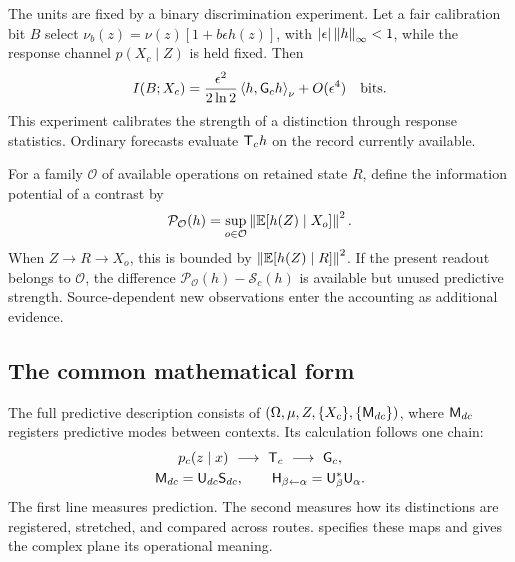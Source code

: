 The units are fixed by a binary discrimination experiment. Let a fair calibration bit \(B\) select \(\nu_b(z)=\nu(z)[1+b\epsilon h(z)]\), with \(|\epsilon|\left\lVert h\right\rVert_\infty<1\), while the response channel \(p(X_c\mid Z)\) is held fixed. Then
\begin{equation}
I(B;X_c)=\frac{\epsilon^2}{2\ln2}\left\langle h,\mathsf G_ch\right\rangle_\nu+O(\epsilon^4)
\quad\text{bits}.
\label{eq:calibration}
\end{equation}
This experiment calibrates the strength of a distinction through response statistics. Ordinary forecasts evaluate \(\mathsf T_ch\) on the record currently available.

For a family \(\mathcal O\) of available operations on retained state \(R\), define the information potential of a contrast by
\begin{equation*}
\mathcal P_{\mathcal O}(h)=\sup_{o\in\mathcal O}
\left\lVert\mathbb E[h(Z)\mid X_o]\right\rVert^2.
\end{equation*}
When \(Z\to R\to X_o\), this is bounded by \(\left\lVert\mathbb E[h(Z)\mid R]\right\rVert^2\). If the present readout belongs to \(\mathcal O\), the difference \(\mathcal P_{\mathcal O}(h)-\mathcal S_c(h)\) is available but unused predictive strength. Source-dependent new observations enter the accounting as additional evidence.

\subsection{The common mathematical form}
The full predictive description consists of \((\Omega,\mu,Z,\{X_c\},\{\mathsf M_{dc}\})\), where \(\mathsf M_{dc}\) registers predictive modes between contexts. Its calculation follows one chain:
\begin{equation}
\begin{gathered}
p_c(z\mid x)\ \longrightarrow\ \mathsf T_c\ \longrightarrow\ \mathsf G_c,\\
\mathsf M_{dc}=\mathsf U_{dc}\mathsf S_{dc},\qquad
\mathsf H_{\beta\leftarrow\alpha}=\mathsf U_\beta^*\mathsf U_\alpha.
\end{gathered}
\label{eq:spine}
\end{equation}
The first line measures prediction. The second measures how its distinctions are registered, stretched, and compared across routes.  specifies these maps and gives the complex plane its operational meaning.
